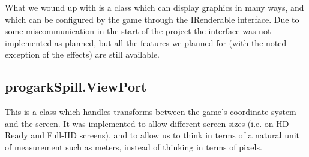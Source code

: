 What we wound up with is a class which can display graphics in many ways, and
which can be configured by the game through the IRenderable interface. Due to
some miscommunication in the start of the project the interface was not 
implemented as planned, but all the features we planned for (with the noted
exception of the effects) are still available.

\subsection{progarkSpill.ViewPort}
This is a class which handles transforms between the game's coordinate-system
and the screen. It was implemented to allow different screen-sizes (i.e. on
HD-Ready and Full-HD screens), and to allow us to think in terms of a natural
unit of measurement such as meters, instead of thinking in terms of pixels.